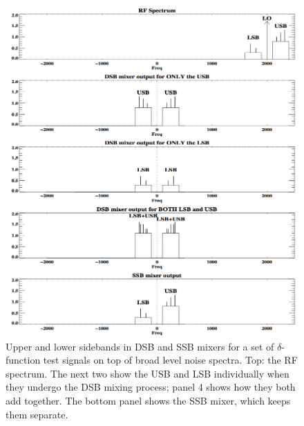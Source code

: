 \documentclass[12pt,preprint]{aastex}
\begin{document}
\begin{figure}[p!]
  \includegraphics[width=6.5in]{sideband.png}
\caption{Upper and lower sidebands in DSB and SSB mixers for a set of
$\delta$-function test signals on top of broad level noise spectra. Top:
  the RF
spectrum. The next two show the USB and LSB individually when
they undergo the DSB mixing process; panel 4 shows how they both add
together. The bottom panel shows the SSB mixer, which keeps them
separate. \label{sideband}}
\end{figure}
%
\end{document}
